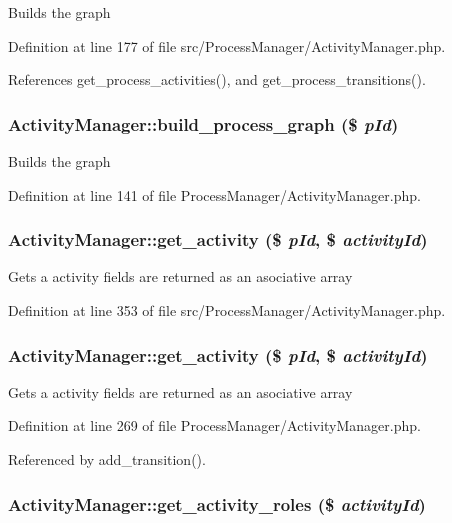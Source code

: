 Builds the graph 

Definition at line 177 of file src/Process\-Manager/Activity\-Manager.php.

References get\_\-process\_\-activities(), and get\_\-process\_\-transitions().
\subsubsection{\setlength{\rightskip}{0pt plus 5cm}Activity\-Manager::build\_\-process\_\-graph (\$ {\em p\-Id})}\label{classActivityManager_a9}


Builds the graph 

Definition at line 141 of file Process\-Manager/Activity\-Manager.php.
\subsubsection{\setlength{\rightskip}{0pt plus 5cm}Activity\-Manager::get\_\-activity (\$ {\em p\-Id}, \$ {\em activity\-Id})}\label{classActivityManager_a31}


Gets a activity fields are returned as an asociative array 

Definition at line 353 of file src/Process\-Manager/Activity\-Manager.php.
\subsubsection{\setlength{\rightskip}{0pt plus 5cm}Activity\-Manager::get\_\-activity (\$ {\em p\-Id}, \$ {\em activity\-Id})}\label{classActivityManager_a12}


Gets a activity fields are returned as an asociative array 

Definition at line 269 of file Process\-Manager/Activity\-Manager.php.

Referenced by add\_\-transition().
\subsubsection{\setlength{\rightskip}{0pt plus 5cm}Activity\-Manager::get\_\-activity\_\-roles (\$ {\em activity\-Id})}\label{classActivityManager_a19}


